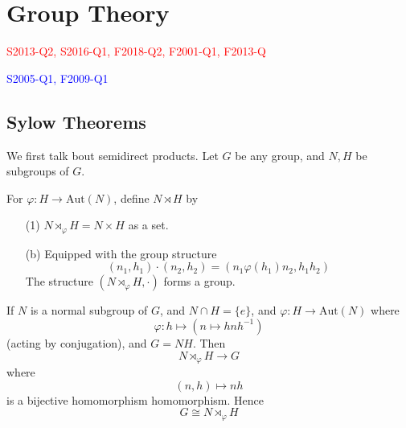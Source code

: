 



\chapter{Group Theory}
\textcolor{red}{S2013-Q2, S2016-Q1, F2018-Q2, F2001-Q1, F2013-Q}

\textcolor{blue}{S2005-Q1, F2009-Q1}


\section{Sylow Theorems}
We first talk bout semidirect products. Let $G$ be any group, and $N,H$ be subgroups of $G$.
\begin{defn}
For $\varphi:H\to\text{Aut}(N)$, define $N\rtimes H$ by 
\begin{itemize}
    \item[(1)] $N\rtimes_\varphi H=N\times H$ as a set.
    \item[(b)] Equipped with the group structure 
    \begin{equation*}
        (n_1,h_1)\cdot (n_2,h_2)=(n_1\varphi(h_1)n_2, h_1h_2)
    \end{equation*}
    The structure $(N\rtimes_\varphi H, \cdot)$ forms a group. 
\end{itemize}
\end{defn}

\begin{example}
    If $N$ is a normal subgroup of $G$, and $N\cap H=\{e\}$, and $\varphi:H\to\text{Aut}(N)$ where 
    \begin{equation*}
        \varphi: h\mapsto (n\mapsto hnh^{-1})
    \end{equation*}
    (acting by conjugation), and $G=NH$. Then 
    \begin{equation*}
        N\rtimes_\varphi H\to G
    \end{equation*}
    where 
    \begin{equation*}
        (n,h)\mapsto nh
    \end{equation*}
    is a bijective homomorphism homomorphism. Hence 
    \begin{equation*}
        G\cong N\rtimes_\varphi H
    \end{equation*}
\end{example}

